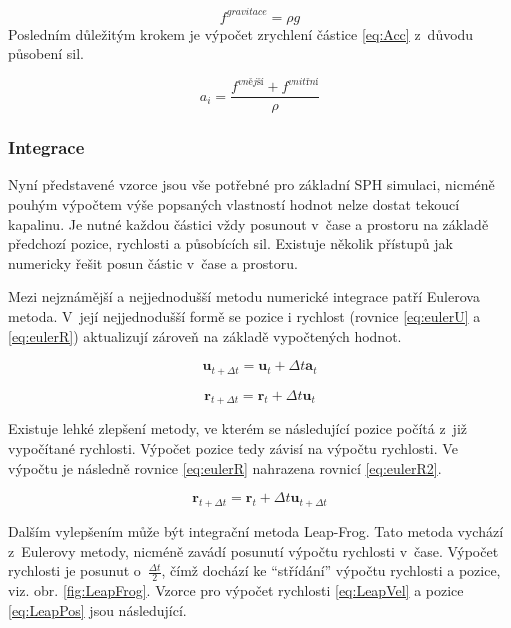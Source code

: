\begin{equation}
	f^{gravitace} = \rho g
	\label{eq:forceGrav}
\end{equation}
Posledním důležitým krokem je výpočet zrychlení částice \ref{eq:Acc} z~důvodu působení sil.

\begin{equation}
	a_i = \frac{f^{\textit{vnější}} + f^{\textit{vnitřní}}}{\rho}
	\label{eq:Acc}
\end{equation}

\subsubsection{Integrace}
Nyní představené vzorce jsou vše potřebné pro základní SPH simulaci, nicméně pouhým výpočtem výše popsaných vlastností hodnot nelze dostat tekoucí kapalinu. Je nutné každou částici vždy posunout v~čase a prostoru na základě předchozí pozice, rychlosti a působících sil. Existuje několik přístupů jak numericky řešit posun částic v~čase a prostoru.

Mezi nejznámější a nejjednodušší metodu numerické integrace patří Eulerova metoda. V~její nejjednodušší formě se pozice i rychlost (rovnice \ref{eq:eulerU} a \ref{eq:eulerR}) aktualizují zároveň na základě vypočtených hodnot.

\begin{equation}
	\mathbf{u}_{t + \Delta t} = \mathbf{u}_t + \Delta t \mathbf{a}_t
	\label{eq:eulerU}
\end{equation}

\begin{equation}
	\mathbf{r}_{t + \Delta t} = \mathbf{r}_t + \Delta t \mathbf{u}_t
	\label{eq:eulerR}
\end{equation}

Existuje lehké zlepšení metody, ve kterém se následující pozice počítá z~již vypočítané rychlosti. Výpočet pozice tedy závisí na výpočtu rychlosti. Ve výpočtu je následně rovnice \ref{eq:eulerR} nahrazena rovnicí \ref{eq:eulerR2}. \cite{KelagerSPH}

\begin{equation}
	\mathbf{r}_{t + \Delta t} = \mathbf{r}_t + \Delta t \mathbf{u}_{t + \Delta t}
	\label{eq:eulerR2}
\end{equation}

Dalším vylepšením může být integrační metoda Leap-Frog. Tato metoda vychází z~Eulerovy metody, nicméně zavádí posunutí výpočtu rychlosti v~čase. Výpočet rychlosti je posunut o~$\frac{\Delta t}{2}$, čímž dochází ke \enquote{střídání} výpočtu rychlosti a pozice, viz. obr. \ref{fig:LeapFrog}. Vzorce pro výpočet rychlosti \ref{eq:LeapVel} a pozice \ref{eq:LeapPos} jsou následující.

